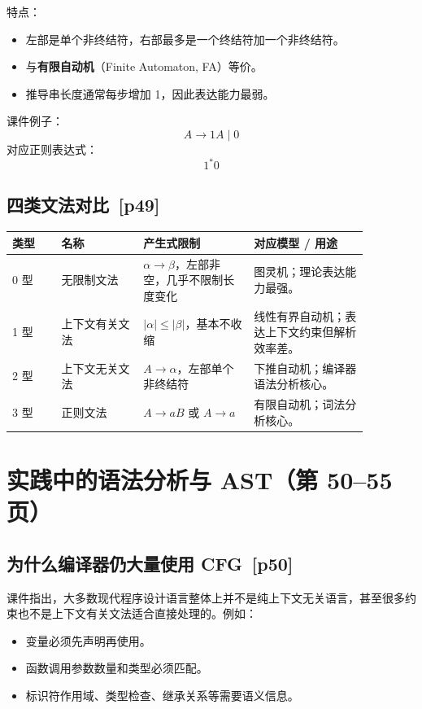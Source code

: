 \documentclass[UTF8,fontset=none,11pt]{ctexart}
\newcommand{\pg}[1]{\texorpdfstring{{\small\color{graytext}\,[p#1]}}{ [p#1]}}
\newcommand{\term}[2]{\textbf{#1}（#2）}
\begin{document}
特点：
\begin{itemize}
  \item 左部是单个非终结符，右部最多是一个终结符加一个非终结符。
  \item 与\term{有限自动机}{Finite Automaton, FA}等价。
  \item 推导串长度通常每步增加 1，因此表达能力最弱。
\end{itemize}

课件例子：
\[
A\to 1A\mid 0
\]
对应正则表达式：
\[
1^*0
\]

\subsection{四类文法对比 \pg{49}}
\begin{longtable}{p{0.12\linewidth}p{0.2\linewidth}p{0.27\linewidth}p{0.28\linewidth}}
\toprule
类型 & 名称 & 产生式限制 & 对应模型 / 用途 \\
\midrule
0 型 & 无限制文法 & \(\alpha\to\beta\)，左部非空，几乎不限制长度变化 & 图灵机；理论表达能力最强。\\
1 型 & 上下文有关文法 & \(|\alpha|\le|\beta|\)，基本不收缩 & 线性有界自动机；表达上下文约束但解析效率差。\\
2 型 & 上下文无关文法 & \(A\to\alpha\)，左部单个非终结符 & 下推自动机；编译器语法分析核心。\\
3 型 & 正则文法 & \(A\to aB\) 或 \(A\to a\) & 有限自动机；词法分析核心。\\
\bottomrule
\end{longtable}

\section{实践中的语法分析与 AST（第 50--55 页）}

\subsection{为什么编译器仍大量使用 CFG \pg{50}}
课件指出，大多数现代程序设计语言整体上并不是纯上下文无关语言，甚至很多约束也不是上下文有关文法适合直接处理的。例如：
\begin{itemize}
  \item 变量必须先声明再使用。
  \item 函数调用参数数量和类型必须匹配。
  \item 标识符作用域、类型检查、继承关系等需要语义信息。
\end{itemize}
\end{document}
